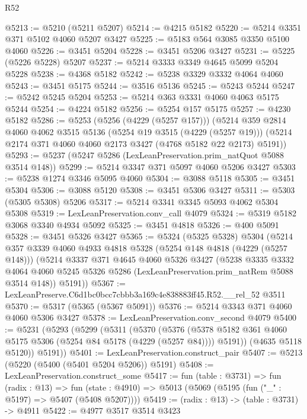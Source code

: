 \begin{lexlean}{R52}
\begin{coremodule}
@5213 := @5210 (@5211 @5207)
@5214 := @4215 @5182
@5220 := @5214 @3351 @371 @5102 @4060 @5207 @3427
@5225 := @5183 @564 @3085 @3350 @5100 @4060
@5226 := @3451 @5204
@5228 := @3451 @5206 @3427
@5231 := @5225 (@5226 @5228) @5207
@5237 := @5214 @3333 @3349 @4645 @5099 @5204 @5228
@5238 := @4368 @5182
@5242 := @5238 @3329 @3332 @4064 @4060
@5243 := @3451 @5175
@5244 := @3516 @5136
@5245 := @5243 @5244
@5247 := @5242 @5245 @5204
@5253 := @5214 @363 @3331 @4060 @4063 @5175 @5244
@5254 := @4224 @5182
@5256 := @5254 @157 @5175
@5257 := @4230 @5182
@5286 := @5253
    (@5256 (@4229 (@5257 @157)))
    (@5214
      @359
      @2814
      @4060
      @4062
      @3515
      @5136
      (@5254 @19 @3515 (@4229 (@5257 @19)))
      (@5214 @2174 @371 @4060 @4060 @2173 @3427 (@4768 @5182 @22 @2173) @5191))
@5293 := @5237 (@5247 @5286 (LexLeanPreservation.prim_natQuot @5088 @3514 @148))
@5299 := @5214 @3347 @371 @5097 @4060 @5206 @3427
@5303 := @5238 @1274 @3346 @5095 @4060
@5304 := @3088 @5118
@5305 := @3451 @5304
@5306 := @3088 @5120
@5308 := @3451 @5306 @3427
@5311 := @5303 (@5305 @5308) @5206
@5317 := @5214 @3341 @3345 @5093 @4062 @5304 @5308
@5319 := LexLeanPreservation.conv_call @4079
@5324 := @5319 @5182 @3068 @3340 @4934 @5092
@5325 := @3451 @4818
@5326 := @400 @5091
@5328 := @3451 @5326 @3427
@5365 := @5324
    (@5325 @5328)
    @5304
    (@5214
      @357
      @3339
      @4060
      @4933
      @4818
      @5328
      (@5254 @148 @4818 (@4229 (@5257 @148)))
      (@5214
        @3337
        @371
        @4645
        @4060
        @5326
        @3427
        (@5238
          @3335
          @3332
          @4064
          @4060
          @5245
          @5326
          @5286
          (LexLeanPreservation.prim_natRem @5088 @3514 @148))
        @5191))
@5367 := LexLeanPreserve.C6d1bc0bcc7cbbb3a169c4e838883ff45.R52.__rel_52 @3511
@5370 := @5317 (@5365 (@5367 @5091))
@5376 := @5214 @3343 @371 @4060 @4060 @5306 @3427
@5378 := LexLeanPreservation.conv_second @4079
@5400 := @5231
    (@5293
      (@5299
        (@5311
          (@5370
            (@5376
              (@5378 @5182 @361 @4060 @5175 @5306 (@5254 @84 @5178 (@4229 (@5257 @84))))
              @5191))
          (@4635 @5118 @5120))
        @5191))
@5401 := LexLeanPreservation.construct_pair
@5407 := @5213 (@5220 (@5400 (@5401 @5204 @5206)) @5191)
@5408 := LexLeanPreservation.construct_some
@5417 := fun (table : @3731) =>
  fun (radix : @13) =>
  fun (state : @4910) => @5013 (@5069 (@5195 (fun ("_" : @5197) => @5407 (@5408 @5207))))
@5419 := (radix : @13) -> (table : @3731) -> @4911
@5422 := @4977 @3517 @3514 @3423

\end{coremodule}
\end{lexlean}
